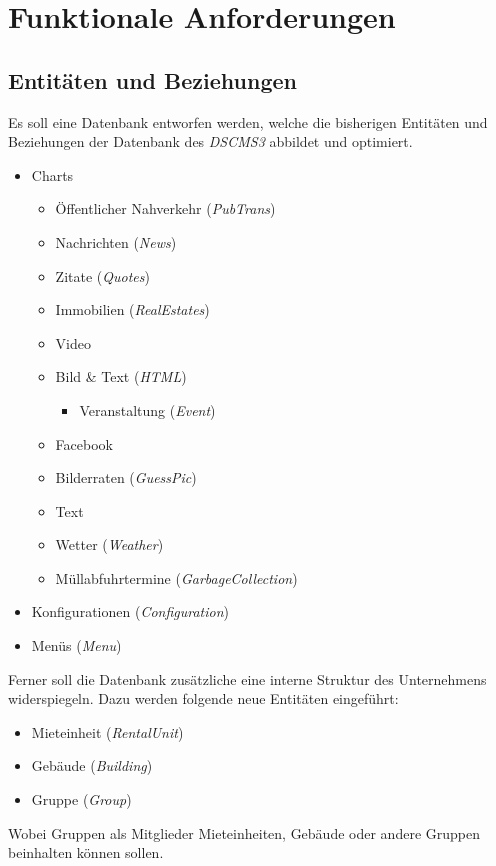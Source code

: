 \documentclass[a4paper]{article}
\begin{document}
	\section{Funktionale Anforderungen}
	\subsection{Entitäten und Beziehungen}
	Es soll eine Datenbank entworfen werden, welche die bisherigen Entitäten und Beziehungen der Datenbank des \emph{DSCMS3} abbildet und optimiert.
	\begin{itemize}
		\item Charts
		\begin{itemize}
			\item Öffentlicher Nahverkehr (\emph{PubTrans})
			\item Nachrichten (\emph{News})
			\item Zitate (\emph{Quotes})
			\item Immobilien (\emph{RealEstates})
			\item Video
			\item Bild \& Text (\emph{HTML})
				\begin{itemize}
					\item Veranstaltung (\emph{Event})
				\end{itemize}
			\item Facebook
			\item Bilderraten (\emph{GuessPic})
			\item Text
			\item Wetter (\emph{Weather})
			\item Müllabfuhrtermine (\emph{GarbageCollection})
		\end{itemize}
		\item Konfigurationen (\emph{Configuration})
		\item Menüs (\emph{Menu})
	\end{itemize}
	Ferner soll die Datenbank zusätzliche eine interne Struktur des Unternehmens widerspiegeln. Dazu werden folgende neue Entitäten eingeführt:
	\begin{itemize}
		\item Mieteinheit (\emph{RentalUnit})
		\item Gebäude (\emph{Building})
		\item Gruppe (\emph{Group})
	\end{itemize}
	Wobei Gruppen als Mitglieder Mieteinheiten, Gebäude oder andere Gruppen beinhalten können sollen.
	\pagebreak
\end{document}

